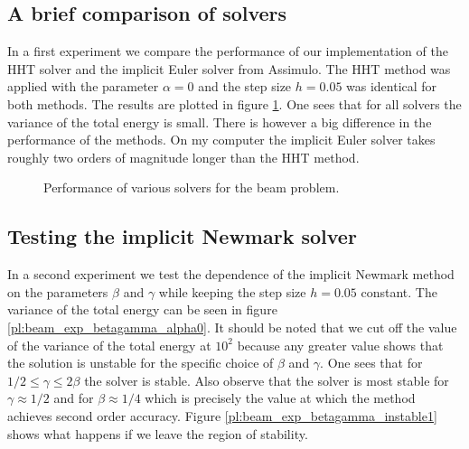 \documentclass{report}
\newcounter{constant}
\begin{document}
\subsection*{A brief comparison of solvers}

In a first experiment we compare the performance of our implementation of the HHT solver and the implicit Euler solver from Assimulo. The HHT method was applied with the parameter $\alpha=0$ and the step size $h=0.05$ was identical for both methods. The results are plotted in figure \ref{tb:beam_exp_solverComparison}. One sees that for all solvers the variance of the total energy is small. There is however a big difference in the performance of the methods. On my computer the implicit Euler solver takes roughly two orders of magnitude longer than the HHT method.

\begin{figure}[h]
\centering

\caption{Performance of various solvers for the beam problem.}
\label{tb:beam_exp_solverComparison}
\end{figure}


\subsection*{Testing the implicit Newmark solver}

In a second experiment we test the dependence of the implicit Newmark method on the parameters $\beta$ and $\gamma$ while keeping the step size $h=0.05$ constant. The variance of the total energy can be seen in figure \ref{pl:beam_exp_betagamma_alpha0}. It should be noted that we cut off the value of the variance of the total energy at $10^2$ because any greater value shows that the solution is unstable for the specific choice of $\beta$ and $\gamma$. One sees that for $1/2\leq \gamma\leq2\beta$ the solver is stable.
Also observe that the solver is most stable for $\gamma\approx1/2$ and for $\beta\approx1/4$ which is precisely the value at which the method achieves second order accuracy. Figure \ref{pl:beam_exp_betagamma_instable1} shows what happens if we leave the region of stability.
\end{document}
